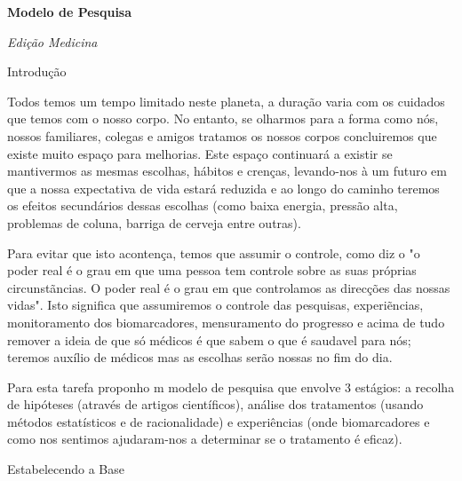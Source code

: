 \documentclass[12pt]{apa6}
\begin{document}
 

\begin{titlepage}
    \begin{center}
        \Huge\textbf{Modelo de Pesquisa}
         
        \Large\textit{Edi\c c\~ao Medicina}
         
        \vspace{10cm}
    \end{center}
\end{titlepage}

\begin{center}
    \Huge{Introdu\c c\~ao}
\end{center}

\justifying
Todos temos um tempo limitado neste planeta, a dura\c c\~ao varia com os
cuidados que temos com o nosso corpo. No entanto, se olharmos para a forma como
n\'os, nossos familiares, colegas e amigos tratamos os nossos corpos
concluiremos que existe muito espa\c co para melhorias. Este espa\c co
continuar\'a a existir se mantivermos as mesmas escolhas, h\'abitos e cren\c
cas,  levando-nos \`a um futuro em que a nossa expectativa de vida estar\'a
reduzida e ao longo do caminho teremos os efeitos secund\'arios dessas escolhas
(como baixa energia, press\~ao alta, problemas de coluna, barriga de cerveja
entre outras).

Para evitar que isto aconten\c ca,  temos que assumir o controle, como diz o
\textcite{Tomassi2011} "o poder real \'e o grau em que uma pessoa tem controle sobre as
suas pr\'oprias circunst\~ancias. O poder real \'e o grau em que controlamos as
direc\c c\~oes das nossas vidas". Isto significa que assumiremos o controle das
pesquisas, experi\~encias, monitoramento dos biomarcadores, mensuramento do
progresso e acima de tudo remover a ideia de que s\'o m\'edicos \'e que
sabem o que \'e saudavel para n\'os; teremos aux\'ilio de m\'edicos mas as
escolhas ser\~ao nossas no fim do dia. 

Para esta tarefa proponho m modelo de pesquisa que envolve 3 est\'agios: a
recolha de hip\'oteses (atrav\'es de artigos cient\'ificos), an\'alise dos
tratamentos (usando m\'etodos estat\'isticos e de racionalidade) e
experi\^encias (onde biomarcadores e como nos sentimos ajudaram-nos a
determinar se o tratamento \'e eficaz). 
\pagebreak


\begin{center}
    \Huge{Estabelecendo a Base}
\end{center}
\end{document}
